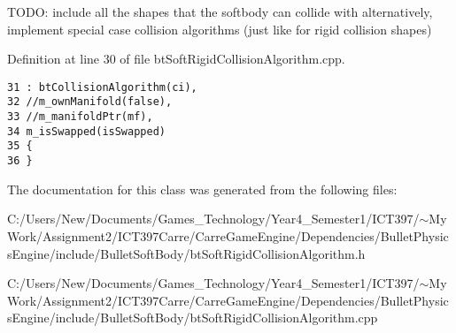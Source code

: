 TODO: include all the shapes that the softbody can collide with alternatively, implement special case collision algorithms (just like for rigid collision shapes) 

Definition at line 30 of file btSoftRigidCollisionAlgorithm.cpp.

\begin{Code}\begin{verbatim}31 : btCollisionAlgorithm(ci),
32 //m_ownManifold(false),
33 //m_manifoldPtr(mf),
34 m_isSwapped(isSwapped)
35 {
36 }
\end{verbatim}
\end{Code}




The documentation for this class was generated from the following files:\begin{CompactItemize}
\item 
C:/Users/New/Documents/Games\_\-Technology/Year4\_\-Semester1/ICT397/$\sim$My Work/Assignment2/ICT397Carre/CarreGameEngine/Dependencies/BulletPhysicsEngine/include/BulletSoftBody/btSoftRigidCollisionAlgorithm.h\item 
C:/Users/New/Documents/Games\_\-Technology/Year4\_\-Semester1/ICT397/$\sim$My Work/Assignment2/ICT397Carre/CarreGameEngine/Dependencies/BulletPhysicsEngine/include/BulletSoftBody/btSoftRigidCollisionAlgorithm.cpp\end{CompactItemize}
